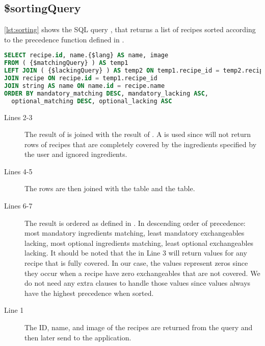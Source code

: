 \subsection*{\$sortingQuery}
\autoref{lst:sorting} shows the SQL query , that returns a list of recipes sorted according to the precedence function defined in .
\begin{lstlisting}[language=SQL, float=h, label={lst:sorting}, caption={\$sortingQuery, combine and sort.}]
SELECT recipe.id, name.{$lang} AS name, image
FROM ( {$matchingQuery} ) AS temp1
LEFT JOIN ( {$lackingQuery} ) AS temp2 ON temp1.recipe_id = temp2.recipe_id
JOIN recipe ON recipe.id = temp1.recipe_id
JOIN string AS name ON name.id = recipe.name
ORDER BY mandatory_matching DESC, mandatory_lacking ASC,
  optional_matching DESC, optional_lacking ASC
\end{lstlisting}
\begin{description}
\item[Lines 2-3] The result of  is joined with the result of . A  is used since  will not return rows of recipes that are completely covered by the ingredients specified by the user and ignored ingredients.
\item[Lines 4-5] The rows are then joined with the  table and the  table. 
\item[Lines 6-7] The result is ordered as defined in . In descending order of precedence: most mandatory ingredients matching, least mandatory exchangeables lacking, most optional ingredients matching, least optional exchangeables lacking. It should be noted that the  in Line 3 will return  values for any recipe that is fully covered. In our case, the  values represent zeros since they occur when a recipe have zero exchangeables that are not covered. We do not need any extra clauses to handle those  values since  values always have the highest precedence when sorted.
\item[Line 1] The ID, name, and image of the recipes are returned from the query and then later send to the application.
\end{description}





